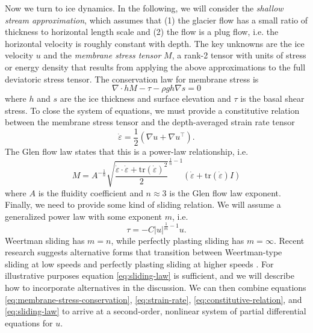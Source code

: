\documentclass{article}
\theoremstyle{definition}
\theoremstyle{plain}
\begin{document}
Now we turn to ice dynamics.
In the following, we will consider the \emph{shallow stream approximation}, which assumes that (1) the glacier flow has a small ratio of thickness to horizontal length scale and (2) the flow is a plug flow, i.e. the horizontal velocity is roughly constant with depth.
The key unknowns are the ice velocity $u$ and the \emph{membrane stress tensor} $M$, a rank-2 tensor with units of stress or energy density that results from applying the above approximations to the full deviatoric stress tensor.
The conservation law for membrane stress is
\begin{equation}
    \nabla\cdot hM - \tau - \rho gh\nabla s = 0
    \label{eq:membrane-stress-conservation}
\end{equation}
where $h$ and $s$ are the ice thickness and surface elevation and $\tau$ is the basal shear stress.
To close the system of equations, we must provide a constitutive relation between the membrane stress tensor and the depth-averaged strain rate tensor
\begin{equation}
    \dot\varepsilon = \frac{1}{2}\left(\nabla u + \nabla u^\top\right).
    \label{eq:strain-rate}
\end{equation}
The Glen flow law states that this is a power-law relationship, i.e.
\begin{equation}
    M = A^{-\frac{1}{n}}\sqrt{\frac{\dot\varepsilon\cdot\dot\varepsilon + \text{tr}(\dot\varepsilon)^2}{2}}^{\frac{1}{n} - 1}\left(\dot\varepsilon + \text{tr}(\dot\varepsilon)I\right)
    \label{eq:constitutive-relation}
\end{equation}
where $A$ is the fluidity coefficient and $n \approx 3$ is the Glen flow law exponent.
Finally, we need to provide some kind of sliding relation.
We will assume a generalized power law with some exponent $m$, i.e.
\begin{equation}
    \tau = -C|u|^{\frac{1}{m} - 1}u.
    \label{eq:sliding-law}
\end{equation}
Weertman sliding has $m = n$, while perfectly plasting sliding has $m = \infty$.
Recent research suggests alternative forms that transition between Weertman-type sliding at low speeds and perfectly plasting sliding at higher speeds \citep{minchew2020toward}.
For illustrative purposes equation \eqref{eq:sliding-law} is sufficient, and we will describe how to incorporate alternatives in the discussion.
We can then combine equations \eqref{eq:membrane-stress-conservation}, \eqref{eq:strain-rate}, \eqref{eq:constitutive-relation}, and \eqref{eq:sliding-law} to arrive at a second-order, nonlinear system of partial differential equations for $u$.
\end{document}
